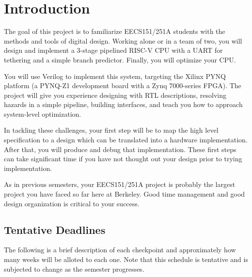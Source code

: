 \section{Introduction}
The goal of this project is to familiarize EECS151/251A students with the methods and tools of digital design.
Working alone or in a team of two, you will design and implement a 3-stage pipelined RISC-V CPU with a UART for tethering and a simple branch predictor.
Finally, you will optimize your CPU.

You will use Verilog to implement this system, targeting the Xilinx PYNQ platform (a PYNQ-Z1 development board with a Zynq 7000-series FPGA).
The project will give you experience designing with RTL descriptions, resolving hazards in a simple pipeline, building interfaces, and teach you how to approach system-level optimization.

In tackling these challenges, your first step will be to map the high level specification to a design which can be translated into a hardware implementation.
After that, you will produce and debug that implementation.
These first steps can take significant time if you have not thought out your design prior to trying implementation.

As in previous semesters, your EECS151/251A project is probably the largest project you have faced so far here at Berkeley.
Good time management and good design organization is critical to your success.


\subsection{Tentative Deadlines}
The following is a brief description of each checkpoint and approximately how many weeks will be alloted to each one.
Note that this schedule is tentative and is subjected to change as the semester progresses.

